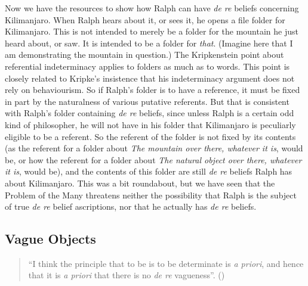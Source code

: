 \documentclass[
  11pt,
  letterpaper,
  DIV=11,
  numbers=noendperiod,
  oneside]{scrartcl}
\begin{document}
Now we have the resources to show how Ralph can have \emph{de re}
beliefs concerning Kilimanjaro. When Ralph hears about it, or sees it,
he opens a file folder for Kilimanjaro. This is not intended to merely
be a folder for the mountain he just heard about, or saw. It is intended
to be a folder for \emph{that}. (Imagine here that I am demonstrating
the mountain in question.) The Kripkenstein point about referential
indeterminacy applies to folders as much as to words. This point is
closely related to Kripke's insistence that his indeterminacy argument
does not rely on behaviourism. So if Ralph's folder is to have a
reference, it must be fixed in part by the naturalness of various
putative referents. But that is consistent with Ralph's folder
containing \emph{de re} beliefs, since unless Ralph is a certain odd
kind of philosopher, he will not have in his folder that Kilimanjaro is
peculiarly eligible to be a referent. So the referent of the folder is
not fixed by its contents (as the referent for a folder about \emph{The
mountain over there, whatever it is}, would be, or how the referent for
a folder about \emph{The natural object over there, whatever it is},
would be), and the contents of this folder are still \emph{de re}
beliefs Ralph has about Kilimanjaro. This was a bit roundabout, but we
have seen that the Problem of the Many threatens neither the possibility
that Ralph is the subject of true \emph{de re} belief ascriptions, nor
that he actually has \emph{de re} beliefs.

\subsection{Vague Objects}\label{vague-objects}

\begin{quote}
``I think the principle that to be is to be determinate is \emph{a
priori}, and hence that it is \emph{a priori} that there is no \emph{de
re} vagueness''. ()
\end{quote}
\end{document}
